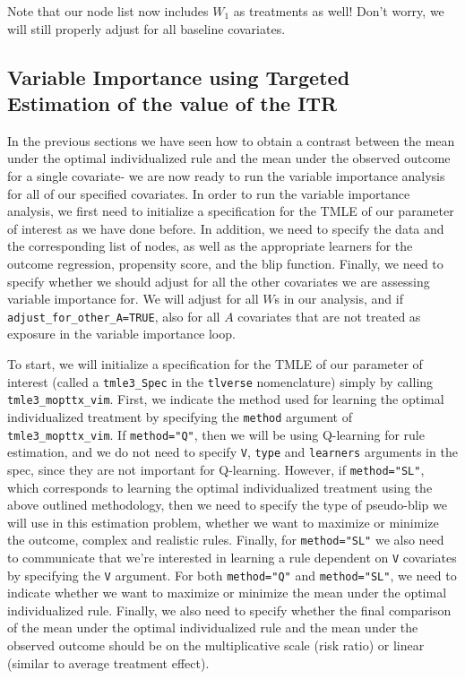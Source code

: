 \documentclass[12pt, krantz2,]{book}
\theoremstyle{definition}
\theoremstyle{definition}
\theoremstyle{definition}
\newcommand{\1}{\mathbbm{1}}
\begin{document}
Note that our node list now includes \(W_1\) as treatments as well! Don't worry,
we will still properly adjust for all baseline covariates.

\hypertarget{variable-importance-using-targeted-estimation-of-the-value-of-the-itr}{%
\subsection{Variable Importance using Targeted Estimation of the value of the ITR}\label{variable-importance-using-targeted-estimation-of-the-value-of-the-itr}}

In the previous sections we have seen how to obtain a contrast between the mean
under the optimal individualized rule and the mean under the observed outcome
for a single covariate- we are now ready to run the variable importance analysis
for all of our specified covariates. In order to run the variable importance
analysis, we first need to initialize a specification for the TMLE of our
parameter of interest as we have done before. In addition, we need to specify
the data and the corresponding list of nodes, as well as the appropriate
learners for the outcome regression, propensity score, and the blip function.
Finally, we need to specify whether we should adjust for all the other
covariates we are assessing variable importance for. We will adjust for all \(W\)s
in our analysis, and if \texttt{adjust\_for\_other\_A=TRUE}, also for all \(A\) covariates
that are not treated as exposure in the variable importance loop.

To start, we will initialize a specification for the TMLE of our parameter of
interest (called a \texttt{tmle3\_Spec} in the \texttt{tlverse} nomenclature) simply by calling
\texttt{tmle3\_mopttx\_vim}. First, we indicate the method used for learning the optimal
individualized treatment by specifying the \texttt{method} argument of
\texttt{tmle3\_mopttx\_vim}. If \texttt{method="Q"}, then we will be using Q-learning for rule
estimation, and we do not need to specify \texttt{V}, \texttt{type} and \texttt{learners} arguments
in the spec, since they are not important for Q-learning. However, if
\texttt{method="SL"}, which corresponds to learning the optimal individualized
treatment using the above outlined methodology, then we need to specify the type
of pseudo-blip we will use in this estimation problem, whether we want to
maximize or minimize the outcome, complex and realistic rules. Finally, for
\texttt{method="SL"} we also need to communicate that we're interested in learning a
rule dependent on \texttt{V} covariates by specifying the \texttt{V} argument. For both
\texttt{method="Q"} and \texttt{method="SL"}, we need to indicate whether we want to maximize
or minimize the mean under the optimal individualized rule. Finally, we also
need to specify whether the final comparison of the mean under the optimal
individualized rule and the mean under the observed outcome should be on the
multiplicative scale (risk ratio) or linear (similar to average treatment
effect).
\end{document}
